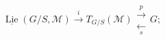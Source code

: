 \[
\underline{\operatorname{Lie}}(G/S,\mathcal M)
 \xrightarrow{\ i\ } T_{G/S}(\mathcal M)
 \mathrel{\substack{\xrightarrow{\ p\ }\\[-0.6em]\xleftarrow[\ s\ ]{}}}G;
\]
